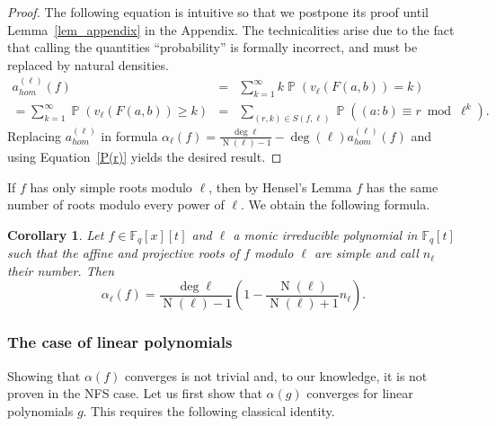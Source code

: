 \documentclass[a4wide]{article}
\newcommand{\F}{{\mathbb F}}
\DeclareMathOperator{\Prob}{\mathbb{P}}
\DeclareMathOperator{\Norm}{N}
\theoremstyle{plain}
\newtheorem{cor}[theo]{Corollary}
\theoremstyle{definition}
\theoremstyle{remark}
\begin{document}
\begin{proof}
The following equation is intuitive so that we postpone its proof until
Lemma~\ref{lem_appendix} in the Appendix. The technicalities arise due to
the fact that calling the quantities ``probability'' is formally
incorrect, and must be replaced by natural densities.
\begin{equation}\label{appendix}
	\begin{array}{rcl}
		a_{hom}^{(\ell)}(f) &=&\sum_{k=1}^\infty k\Prob(v_\ell(F(a,b))=k)\\
	=\sum_{k=1}^\infty\Prob(v_\ell(F(a,b))\geq k)&=&\sum_{(r,k)\in
	S(f,\ell)}\Prob((a:b)\equiv r \bmod \ell^k).
\end{array}
\end{equation}
Replacing $a_{hom}^{(\ell)}$ in formula $\alpha_\ell(f)=\frac{\deg
\ell}{\Norm(\ell)-1}-\deg(\ell)a_{hom}^{(\ell)}(f)$ and using Equation~\ref{P(r)} yields the desired result.  


\end{proof}
If $f$ has only simple roots modulo $\ell$, then by Hensel's Lemma $f$ has
the same number of roots modulo every power of $\ell$. We obtain the
following formula.
\begin{cor}\label{cor_ell}
    Let $f\in\F_q[x][t]$ and $\ell$ a monic irreducible polynomial
	in $\F_q[t]$ such that the affine and projective roots of $f$
        modulo $\ell$ are simple and call $n_\ell$ their number. Then 
	\begin{equation}\label{cor_ell_eq}
		\alpha_\ell(f)=	\frac{\deg
		\ell}{\Norm(\ell)-1}\left(1-\frac{
                \Norm(\ell)}{\Norm(\ell)+1} n_\ell\right).
	\end{equation}
\end{cor}





\subsubsection{The case of linear polynomials}
Showing that $\alpha(f)$ converges is not trivial and, to our knowledge, it
is not proven in the NFS case. Let us first show that
$\alpha(g)$ converges for linear polynomials $g$.
This requires the following classical identity.
\end{document}

